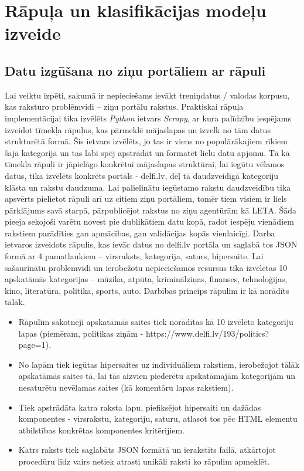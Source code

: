 \chapter{Rāpuļa un klasifikācijas modeļu izveide}
\section{Datu izgūšana no ziņu portāliem ar rāpuli}
Lai veiktu izpēti, sakumā ir nepieciešams ievākt treniņdatus / valodas korpusu, kas raksturo problēmvidi – ziņu portālu rakstus. Praktiskai rāpuļa implementācijai tika izvēlēts \textit{Python} ietvars \textit{Scrapy}, ar kura palīdzību iespējams izveidot tīmekļa rāpuļus, kas pārmeklē mājaslapas un izvelk no tām datus strukturētā formā. Šis ietvars izvēlēts, jo tas ir viens no populārākajiem rīkiem šajā kategorijā un tas labi spēj apstrādāt un formatēt lielu datu apjomu. Tā kā tīmekļa rāpuļi ir jāpielāgo konkrētai mājaslapas struktūrai, lai iegūtu vēlamos datus, tika izvēlēts konkrēts portāls - delfi.lv, dēļ tā daudzveidīgā kategoriju klāsta un rakstu daudzuma. Lai palielinātu iegūstamo rakstu daudzveidību tika apsvērts pielietot rāpuli arī uz citiem ziņu portāliem, tomēr tiem visiem ir liels pārklājums savā starpā, pārpublicējot rakstus no ziņu aģentūrām kā LETA. Šāda pieeja sekojoši varētu novest pie dublikātiem datu kopā, radot iespēju vienādiem rakstiem parādīties gan apmācības, gan validācijas kopās vienlaicīgi. Darba ietvaros izveidots rāpulis, kas ievāc datus no delfi.lv portāla un saglabā tos JSON formā ar 4 pamatlaukiem – virsraksts, kategorija, saturs, hipersaite. Lai sašaurinātu problēmvidi un ierobežotu nepieciešamos resursus tika izvēlētas 10 apskatāmās kategorijas – mūzika, atpūta, kriminālziņas, finanses, tehnoloģijas, kino, literatūra, politika, sports, auto. Darbības princips rāpulim ir kā norādīts tālāk.
\begin{itemize}
\item Rāpulim sākotnēji apskatāmās saites tiek norādītas kā 10 izvēlēto kategoriju lapas (piemēram, politikas ziņām - https://www.delfi.lv/193/politics?page=1).
\item No lapām tiek iegūtas hipersaites uz individuāliem rakstiem, ierobežojot tālāk apskatāmās saites tā, lai tās aizvien piederētu apskatāmajām kategorijām un nesaturētu nevēlamas saites (kā komentāru lapas rakstiem).
\item Tiek apstrādāta katra raksta lapu, piefiksējot hipersaiti un dažādas komponentes - virsrakstu, kategoriju, saturu, atlasot tos pēc HTML elementu atbilstības konkrētas komponentes kritērijiem.
\item Katrs raksts tiek saglabāts JSON formātā un ierakstīts failā, atkārtojot procedūru līdz vairs netiek atrasti unikāli raksti ko rāpulim apmeklēt.
\end{itemize}

